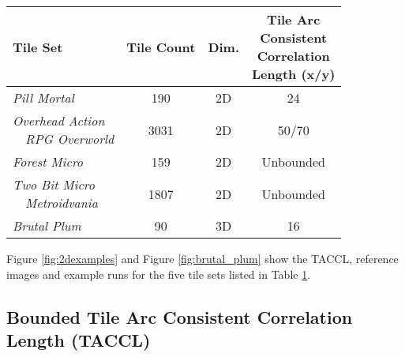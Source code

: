 
\begin{table}[h]
  \caption{ }
  \label{table:tilesets}
  \centering
  \begin{tabular}[t]{lccc}
    \hline
     Tile Set & Tile Count & Dim. & \specialcellCenter{Tile Arc \\ Consistent \\ Correlation \\ Length (x/y)} \\
     \hline
     \textit{Pill Mortal} & 190 & 2D & 24 \\
     \specialcell{\textit{Overhead Action} \\ \ \ \textit{RPG Overworld}} \cite{LUNARSIGNALS_oarpgo} & 3031 & 2D & 50/70 \\
     \textit{Forest Micro} \cite{ThKaspar_micro} & 159 & 2D & Unbounded  \\
     \specialcell{\textit{Two Bit Micro} \\ \ \ \textit{Metroidvania} } \cite{0x72_2bmmv} & 1807 & 2D & Unbounded  \\
     \textit{Brutal Plum} & 90 & 3D & 16 \\
     \hline
  \end{tabular}
\end{table}

Figure \ref{fig:2dexamples} and Figure \ref{fig:brutal_plum} show the TACCL, reference images and example runs
for the five tile sets listed in Table \ref{table:tilesets}.



\subsection{Bounded Tile Arc Consistent Correlation Length (TACCL)}

